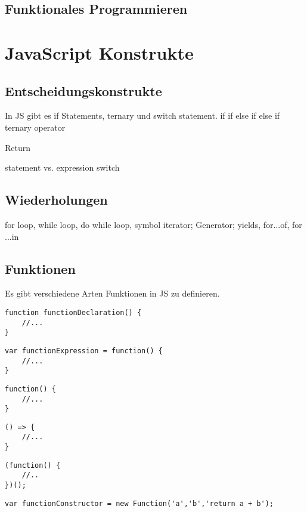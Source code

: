 \documentclass[babel]{book}
\begin{document}
\section{Funktionales Programmieren}
\chapter{JavaScript Konstrukte}
\section{Entscheidungskonstrukte}
In JS gibt es if Statements, ternary und switch statement.
if
if else
if else if 
ternary operator

Return 

statement vs. expression
switch

\section{Wiederholungen}
for loop, while loop, do while loop, symbol iterator; Generator; yields, for...of, for ...in

\section{Funktionen}
Es gibt verschiedene Arten Funktionen in JS zu definieren. 

\begin{lstlisting}[caption=Array Konstruktor]
function functionDeclaration() {
	//...
}
\end{lstlisting}

\begin{lstlisting}[caption=Array Konstruktor]
var functionExpression = function() {
	//...
}
\end{lstlisting}

\begin{lstlisting}[caption=Anonymous function]
function() {
	//...
}
\end{lstlisting}

\begin{lstlisting}[caption=Arrow function]
() => {
	//...
}
\end{lstlisting}


\begin{lstlisting}[caption=IIFE]
(function() {
	//..
})();
\end{lstlisting}


\begin{lstlisting}[caption=IIFE]
var functionConstructor = new Function('a','b','return a + b');
\end{lstlisting}
\end{document}

